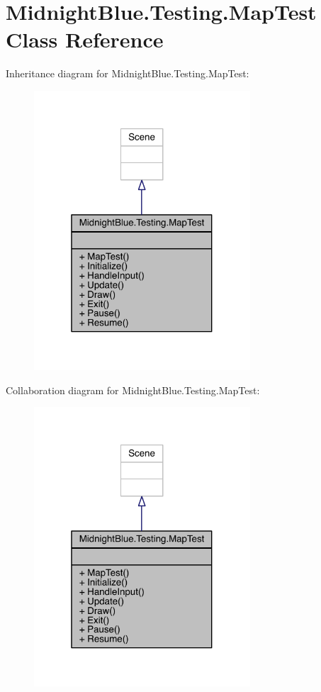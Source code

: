 \hypertarget{class_midnight_blue_1_1_testing_1_1_map_test}{}\section{Midnight\+Blue.\+Testing.\+Map\+Test Class Reference}
\label{class_midnight_blue_1_1_testing_1_1_map_test}


Inheritance diagram for Midnight\+Blue.\+Testing.\+Map\+Test\+:
\nopagebreak
\begin{figure}[H]
\begin{center}
\leavevmode
\includegraphics[width=229pt]{class_midnight_blue_1_1_testing_1_1_map_test__inherit__graph}
\end{center}
\end{figure}


Collaboration diagram for Midnight\+Blue.\+Testing.\+Map\+Test\+:
\nopagebreak
\begin{figure}[H]
\begin{center}
\leavevmode
\includegraphics[width=229pt]{class_midnight_blue_1_1_testing_1_1_map_test__coll__graph}
\end{center}
\end{figure}
